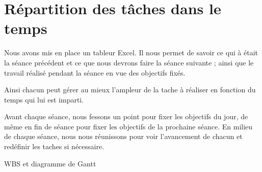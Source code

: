 \chapter{Répartition des tâches dans le temps}

Nous avons mis en place un tableur Excel. Il nous permet de savoir ce qui à était la séance précédent et ce que nous devrons faire la séance suivante ; ainsi que le travail réalisé pendant la séance en vue des objectifs fixés. 

Ainsi chacun peut gérer au mieux l'ampleur de la tache à réaliser en fonction du temps qui lui est imparti.
 
Avant chaque séance, nous fessons un point pour fixer les objectifs du jour, de même en fin de séance pour fixer les objectifs de la prochaine séance. 
En milieu de chaque séance, nous nous réunissons pour voir l'avancement de chacun et redéfinir les taches si nécessaire. 

WBS et diagramme de Gantt
